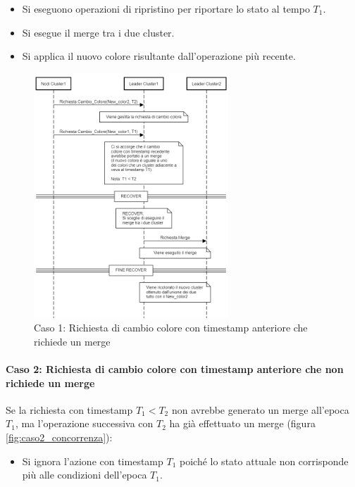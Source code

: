 \documentclass[12pt, a4paper]{report}
\begin{document}
\begin{itemize}
    \item Si eseguono operazioni di ripristino per riportare lo stato al tempo $T_1$.
    \item Si esegue il merge tra i due cluster.
    \item Si applica il nuovo colore risultante dall'operazione pi\`u recente.
\end{itemize}

\begin{figure}[H]
    \centering
    \includegraphics[width=0.65\textwidth,align=t]{images/concorrenza/caso1.png}
    \caption{Caso 1: Richiesta di cambio colore con timestamp anteriore che richiede un merge}
    \label{fig:caso1_concorrenza}
\end{figure}

\newpage
\paragraph{Caso 2: Richiesta di cambio colore con timestamp anteriore che non richiede un merge}

Se la richiesta con timestamp $T_1 < T_2$ non avrebbe generato un merge all'epoca $T_1$, ma l'operazione successiva con $T_2$ ha gi\`a effettuato un merge (figura \ref{fig:caso2_concorrenza}):

\begin{itemize}
    \item Si ignora l'azione con timestamp $T_1$ poiché lo stato attuale non corrisponde pi\`u alle condizioni dell'epoca $T_1$.
\end{itemize}
\end{document}
